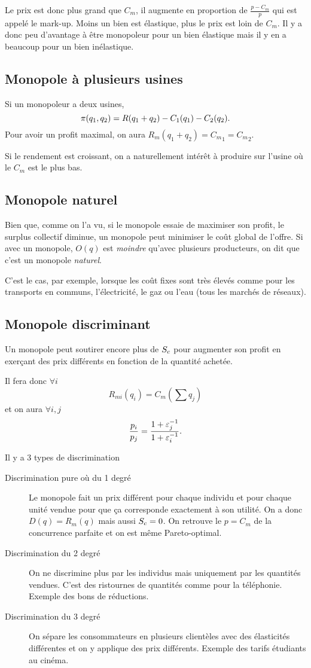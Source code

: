 Le prix est donc plus grand que $C_m$, il augmente en proportion de
$\frac{p-C_m}{p}$ qui est appelé le mark-up.
Moins un bien est élastique, plus le prix est loin de $C_m$.
Il y a donc peu d'avantage à être monopoleur pour un bien élastique
mais il y en a beaucoup pour un bien inélastique.

\subsection{Monopole à plusieurs usines}
Si un monopoleur a deux usines,
\[ \pi(q_1,q_2) = R(q_1 + q_2) - C_1(q_1) - C_2(q_2). \]
Pour avoir un profit maximal, on aura
$R_m(q_1+q_2) = {C_m}_1 = {C_m}_2$.

Si le rendement est croissant, on a naturellement intérêt à produire
sur l'usine où le $C_m$ est le plus bas.


\subsection{Monopole naturel}
Bien que, comme on l'a vu, si le monopole essaie de maximiser
son profit, le surplus collectif diminue,
un monopole peut minimiser le coût global de l'offre.
Si avec un monopole, $O(q)$ est \emph{moindre} qu'avec plusieurs producteurs,
on dit que c'est un monopole \emph{naturel}.

C'est le cas, par exemple, lorsque les coût fixes sont très élevés comme
pour les transports en communs, l'électricité, le gaz ou l'eau
(tous les marchés de réseaux).

\subsection{Monopole discriminant}
Un monopole peut soutirer encore plus de ${S_c}$ pour augmenter
son profit en exerçant des prix différents en fonction de la quantité
achetée.

Il fera donc $\forall i$
\[ R_{mi}(q_i) = C_m(\sum q_j) \]
et on aura $\forall i,j$
\[ \frac{p_i}{p_j} = \frac{1+\varepsilon_j^{-1}}{1+\varepsilon_i^{-1}}. \]

Il y a 3 types de discrimination
\begin{description}
  \item[Discrimination pure où du 1\ier{} degré]
    Le monopole fait un prix différent pour chaque individu et pour chaque
    unité vendue pour que ça corresponde exactement à son utilité.
    On a donc $D(q) = R_m(q)$ mais aussi ${S_c} = 0$.
    On retrouve le $p = C_m$ de la concurrence parfaite et on est même
    Pareto-optimal.
  \item[Discrimination du 2\ieme{} degré]
    On ne discrimine plus par les individus mais uniquement par les quantités
    vendues.
    C'est des ristournes de quantités comme pour la téléphonie.
    Exemple des bons de réductions.
  \item[Discrimination du 3\ieme{} degré]
    On sépare les consommateurs en plusieurs clientèles avec des élasticités
    différentes et on y applique des prix différents.
    Exemple des tarifs étudiants au cinéma.
\end{description}

